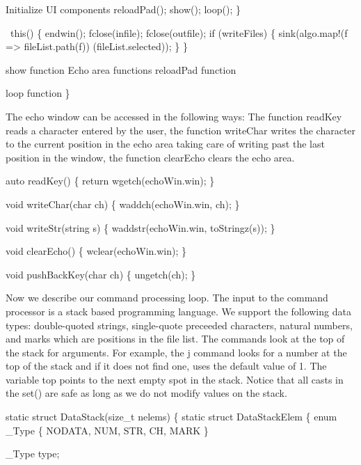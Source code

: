     \LA{}Initialize UI components\RA{}
    reloadPad();
    show();
    loop();
  \}

  ~this() \{
    endwin();
    fclose(infile);
    fclose(outfile);
    if (writeFiles) \{
        sink(algo.map!(f => fileList.path(f))
                      (fileList.selected));
    \}
  \}
  
  \LA{}show function\RA{}
  \LA{}Echo area functions\RA{}
  \LA{}reloadPad function\RA{}

  \LA{}loop function\RA{}
\}

\nwendcode{}The echo window can be accessed in the following ways: The function
{\Tt{}readKey\nwendquote} reads a character entered by the user, the function
{\Tt{}writeChar\nwendquote} writes the character to the current position in the echo
area taking care of writing past the last position in the window, the
function {\Tt{}clearEcho\nwendquote} clears the echo area.

\nwenddocs{}\endmoddef\nwstartdeflinemarkup\nwenddeflinemarkup
auto readKey()
\{
  return wgetch(echoWin.win);
\}

void writeChar(char ch)
\{
  waddch(echoWin.win, ch);
\}

void writeStr(string s)
\{
  waddstr(echoWin.win, toStringz(s));
\}

void clearEcho()
\{
  wclear(echoWin.win);
\}

void pushBackKey(char ch)
\{
  ungetch(ch);
\}

\nwendcode{}Now we describe our command processing loop. The input to the
command processor is a stack based programming language. We support
the following data types: double-quoted strings, single-quote
preceeded characters, natural numbers, and marks which are positions
in the file list. The commands look at the top of the stack for
arguments. For example, the {\Tt{}j\nwendquote} command looks for a number at the
top of the stack and if it does not find one, uses the default value
of 1. The variable {\Tt{}top\nwendquote} points to the next empty spot in the
stack. Notice that all casts in the {\Tt{}set()\nwendquote} are safe as long as we
do not modify values on the stack.

\nwenddocs{}\endmoddef\nwstartdeflinemarkup\nwenddeflinemarkup
static struct DataStack(size_t nelems) \{
  static struct DataStackElem \{
    enum _Type \{ NODATA, NUM, STR, CH, MARK \}

    _Type type;
  
